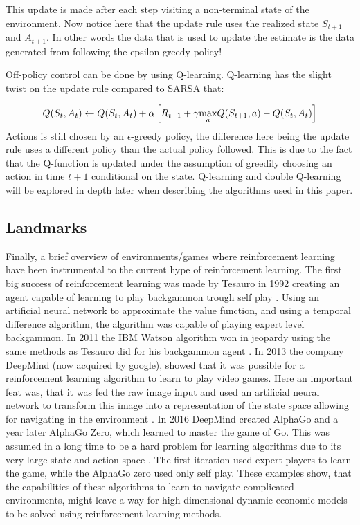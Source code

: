 This update is made after each step visiting a non-terminal state of the environment. 
Now notice here that the update rule uses the realized state $S_{t+1}$ and $A_{t+1}$. In other words the data that is used to update the estimate is the data generated from following the epsilon greedy policy! 

Off-policy control can be done by using Q-learning. Q-learning has the slight twist on the update rule compared to SARSA that:

\begin{equation}
    Q(S_t, A_t) \leftarrow Q(S_t, A_t) + \alpha \left[ R_{t+1} + \gamma \underset{a}{\max} Q(S_{t + 1}, a) - Q(S_t, A_t) \right] 
\end{equation}
Actions is still chosen by an $\epsilon$-greedy policy, the difference here being the update rule uses a different policy than the actual policy followed. This is due to the fact that the Q-function is updated under the assumption of greedily choosing an action in time $t+1$ conditional on the state. Q-learning and double Q-learning will be explored in depth later when describing the algorithms used in this paper.

\subsection{Landmarks}

Finally, a brief overview of environments/games where reinforcement learning have been instrumental to the current hype of reinforcement learning. The first big success of reinforcement learning was made by Tesauro in 1992 creating an agent capable of learning to play backgammon trough self play \parencite{sutton_reinforcement_2018}. Using an artificial neural network to approximate the value function, and using a temporal difference algorithm, the algorithm was capable of playing expert level backgammon. In 2011 the IBM Watson algorithm won in jeopardy using the same methods as Tesauro did for his backgammon agent \parencite{sutton_reinforcement_2018}. In 2013 the company DeepMind (now acquired by google), showed that it was possible for a reinforcement learning algorithm to learn to play video games. Here an important feat was, that it was fed the raw image input and used an artificial neural network to transform this image into a representation of the state space allowing for navigating in the environment \parencite{mnih_playing_2013}. In 2016 DeepMind created AlphaGo and a year later AlphaGo Zero, which learned to master the game of Go. This was assumed in a long time to be a hard problem for learning algorithms due to its very large state and action space \parencite{silver_general_2018}. The first iteration used expert players to learn the game, while the AlphaGo zero used only self play. These examples show, that the capabilities of these algorithms to learn to navigate complicated environments, might leave a way for high dimensional dynamic economic models to be solved using reinforcement learning methods.